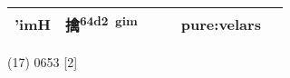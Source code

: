 \documentclass[14pt,a4paper]{scrartcl}
\begin{document}
\begin{longtable}[c]{@{}llllll@{}}
\begin{minipage}[t]{0.14\columnwidth}
'imH
\strut\end{minipage} &
\begin{minipage}[t]{0.14\columnwidth}\raggedright\strut
擒\textsuperscript{64d2~gim}
\strut\end{minipage} &
\begin{minipage}[t]{0.14\columnwidth}\raggedright\strut
\strut\end{minipage} &
\begin{minipage}[t]{0.14\columnwidth}\raggedright\strut
\strut\end{minipage} &
\begin{minipage}[t]{0.14\columnwidth}\raggedright\strut
pure:velars
\strut\end{minipage}\tabularnewline
\bottomrule
\end{longtable}

(17) 0653 {[}2{]}
\end{document}
